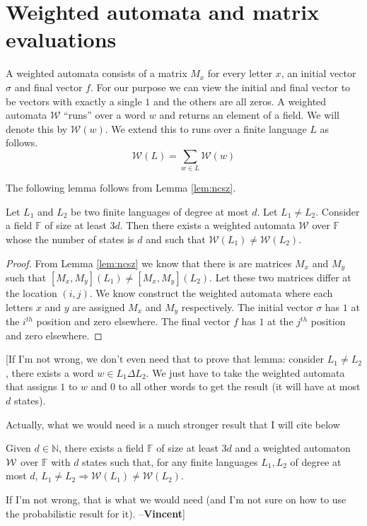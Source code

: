 \documentclass[english,course]{lecture}
\newcommand{\Mxy}[1]{[M_x,M_y](#1)}
\newcommand{\field}{\mathbb{F}}
\newcommand{\wa}[1]{\mathcal{W}#1}
\newcommand\vincent[1]{{\color{blue} [#1 --\textbf{Vincent}]}}
\begin{document}
\section{Weighted automata and matrix evaluations}
A weighted automata consists of a matrix $M_x$ for every letter $x$, an initial vector $\sigma$ and final vector $f$. For our purpose we can view the initial and final vector to be vectors with exactly a single $1$ and the others are all zeros. A weighted automata $\wa {}$ ``runs'' over a word $w$ and returns an element of a field. We will denote this by $\wa{(w)}$. We extend this to runs over a finite language $L$ as follows.
\[
\wa{(L)} = \sum_{w \in L} \wa{(w)}
\]

The following lemma follows from Lemma \ref{lem:ncsz}.
\begin{lemma}
\label{lem:wa}
Let $L_1$ and $L_2$ be two finite languages of degree at most $d$. Let $L_1 \neq L_2$. Consider a field $\field$ of size at least $3d$. Then there exists a weighted automata $\wa{}$ over $\field$ whose the number of states is $d$ and such that $\wa{(L_1)} \neq \wa{(L_2)}$.
\end{lemma}
\begin{proof}
From Lemma \ref{lem:ncsz} we know that there is are matrices $M_x$ and $M_y$ such that $\Mxy {L_1} \neq \Mxy {L_2}$. Let these two matrices differ at the location $(i,j)$. We know construct the weighted automata where each letters $x$ and $y$ are assigned $M_x$ and $M_y$ respectively. The initial vector $\sigma$ has $1$ at the $i^{th}$ position and zero elsewhere. The final vector $f$ has $1$ at the $j^{th}$ position and zero elsewhere.
\end{proof}

\vincent{If I'm not wrong, we don't even need that to prove that lemma: consider $L_1 \neq L_2$, there exists a word $w \in L_1 \Delta L_2$. We just have to take the weighted automata that assigns $1$ to $w$ and $0$ to all other words to get the result (it will have at most $d$ states).

Actually, what we would need is a much stronger result that I will cite below

\begin{lemma}
    Given $d\in\mathbb{N}$, there exists a field $\field$ of size at least $3d$ and a weighted automaton $\wa$ over $\field$ with $d$ states such that, for any finite languages $L_1, L_2$ of degree at most $d$, $L_1 \neq L_2 \Rightarrow \wa(L_1) \neq \wa(L_2)$.
\end{lemma}

If I'm not wrong, that is what we would need (and I'm not sure on how to use the probabilistic result for it).
}
\end{document}
